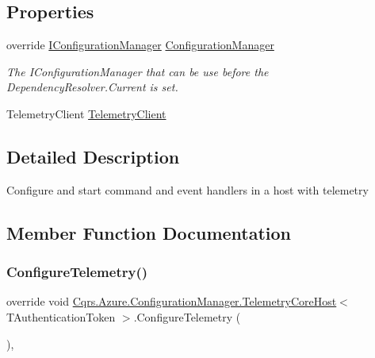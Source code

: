 \subsection*{Properties}
\begin{DoxyCompactItemize}
\item 
override \hyperlink{interfaceCqrs_1_1Configuration_1_1IConfigurationManager}{I\+Configuration\+Manager} \hyperlink{classCqrs_1_1Azure_1_1ConfigurationManager_1_1TelemetryCoreHost_a2878745a14876ad8e3914a548970232d_a2878745a14876ad8e3914a548970232d}{Configuration\+Manager}
\begin{DoxyCompactList}\small\item\em The I\+Configuration\+Manager that can be use before the Dependency\+Resolver.\+Current is set. \end{DoxyCompactList}\item 
Telemetry\+Client \hyperlink{classCqrs_1_1Azure_1_1ConfigurationManager_1_1TelemetryCoreHost_a8fe3736539c6f97ea4ac088cebbc19e5_a8fe3736539c6f97ea4ac088cebbc19e5}{Telemetry\+Client}
\end{DoxyCompactItemize}


\subsection{Detailed Description}
Configure and start command and event handlers in a host with telemetry 



\subsection{Member Function Documentation}
\mbox{\label{classCqrs_1_1Azure_1_1ConfigurationManager_1_1TelemetryCoreHost_abcb4e14f33f2b85b95a2b80c4555748a_abcb4e14f33f2b85b95a2b80c4555748a}} 
\subsubsection{\texorpdfstring{Configure\+Telemetry()}{ConfigureTelemetry()}}
{\footnotesize\ttfamily override void \hyperlink{classCqrs_1_1Azure_1_1ConfigurationManager_1_1TelemetryCoreHost}{Cqrs.\+Azure.\+Configuration\+Manager.\+Telemetry\+Core\+Host}$<$ T\+Authentication\+Token $>$.Configure\+Telemetry (\begin{DoxyParamCaption}{ }\end{DoxyParamCaption})\hspace{0.3cm}{\ttfamily [protected]}, {\ttfamily [virtual]}}



